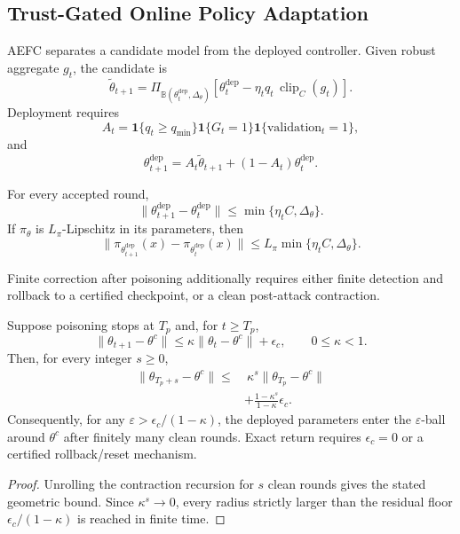 \subsection{Trust-Gated Online Policy Adaptation}
AEFC separates a candidate model from the deployed controller. Given robust aggregate $g_t$, the candidate is
\begin{equation}
\widetilde\theta_{t+1}=
\Pi_{\mathbb B(\theta_t^{\mathrm{dep}},\Delta_\theta)}
\left[\theta_t^{\mathrm{dep}}
-\eta_t q_t\,\operatorname{clip}_C(g_t)\right].
\end{equation}
Deployment requires
\begin{equation}
A_t=
\mathbf 1\{q_t\ge q_{\min}\}
\mathbf 1\{G_t=1\}
\mathbf 1\{\mathrm{validation}_t=1\},
\end{equation}
and
\begin{equation}
\theta_{t+1}^{\mathrm{dep}}=
A_t\widetilde\theta_{t+1}
+(1-A_t)\theta_t^{\mathrm{dep}}.
\end{equation}

\begin{theorem}
For every accepted round,
\begin{equation}
\|\theta_{t+1}^{\mathrm{dep}}-\theta_t^{\mathrm{dep}}\|
\le
\min\{\eta_tC,\Delta_\theta\}.
\end{equation}
If $\pi_\theta$ is $L_\pi$-Lipschitz in its parameters, then
\begin{equation}
\|\pi_{\theta_{t+1}^{\mathrm{dep}}}(x)
-\pi_{\theta_t^{\mathrm{dep}}}(x)\|
\le
L_\pi\min\{\eta_tC,\Delta_\theta\}.
\end{equation}
\end{theorem}

Finite correction after poisoning additionally requires either finite detection and rollback to a certified checkpoint, or a clean post-attack contraction.
\begin{corollary}
Suppose poisoning stops at $T_p$ and, for $t\ge T_p$,
\begin{equation}
\|\theta_{t+1}-\theta^c\|
\le\kappa\|\theta_t-\theta^c\|+\epsilon_c,
\qquad 0\le\kappa<1.
\end{equation}
Then, for every integer $s\ge0$,
\begin{align}
\|\theta_{T_p+s}-\theta^c\|
\le&\ \kappa^s\|\theta_{T_p}-\theta^c\| \nonumber\\
&+\frac{1-\kappa^s}{1-\kappa}\epsilon_c.
\end{align}
Consequently, for any $\varepsilon>\epsilon_c/(1-\kappa)$, the deployed parameters enter the $\varepsilon$-ball around $\theta^c$ after finitely many clean rounds. Exact return requires $\epsilon_c=0$ or a certified rollback/reset mechanism.
\end{corollary}
\begin{proof}
Unrolling the contraction recursion for $s$ clean rounds gives the stated geometric bound. Since $\kappa^s\to0$, every radius strictly larger than the residual floor $\epsilon_c/(1-\kappa)$ is reached in finite time.
\end{proof}

